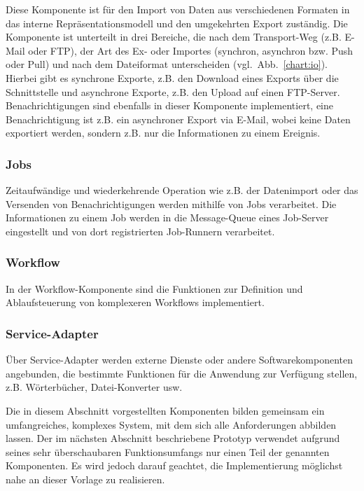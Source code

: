Diese Komponente ist für den Import von Daten aus verschiedenen Formaten in das interne Repräsentationsmodell und den umgekehrten Export zuständig. Die Komponente ist unterteilt in drei Bereiche, die nach dem Transport-Weg (z.B. E-Mail oder FTP), der Art des Ex- oder Importes (synchron, asynchron bzw. Push oder Pull) und nach dem Dateiformat unterscheiden (vgl.~Abb.~\ref{chart:io}).  Hierbei gibt es synchrone Exporte, z.B. den Download eines Exports über die Schnittstelle und asynchrone Exporte, z.B. den Upload auf einen FTP-Server. Benachrichtigungen sind ebenfalls in dieser Komponente implementiert, eine Benachrichtigung ist z.B. ein asynchroner Export via E-Mail, wobei keine Daten exportiert werden, sondern z.B. nur die Informationen zu einem Ereignis.

\subsubsection{Jobs}

Zeitaufwändige und wiederkehrende Operation wie z.B. der Datenimport oder das Versenden von Benachrichtigungen werden mithilfe von Jobs verarbeitet. Die Informationen zu einem Job werden in die Message-Queue eines Job-Server eingestellt und von dort registrierten Job-Runnern verarbeitet.

\subsubsection{Workflow}

In der Workflow-Komponente sind die Funktionen zur Definition und Ablaufsteuerung von komplexeren Workflows implementiert.

\subsubsection{Service-Adapter}

Über Service-Adapter werden externe Dienste oder andere Softwarekomponenten angebunden, die bestimmte Funktionen für die Anwendung zur Verfügung stellen, z.B. Wörterbücher, Datei-Konverter usw.

\secbar

Die in diesem Abschnitt vorgestellten Komponenten bilden gemeinsam ein umfangreiches, komplexes System, mit dem sich alle Anforderungen abbilden lassen. Der im nächsten Abschnitt beschriebene Prototyp verwendet aufgrund seines sehr überschaubaren Funktionsumfangs nur einen Teil der genannten Komponenten. Es wird jedoch darauf geachtet, die Implementierung möglichst nahe an dieser Vorlage zu realisieren.


